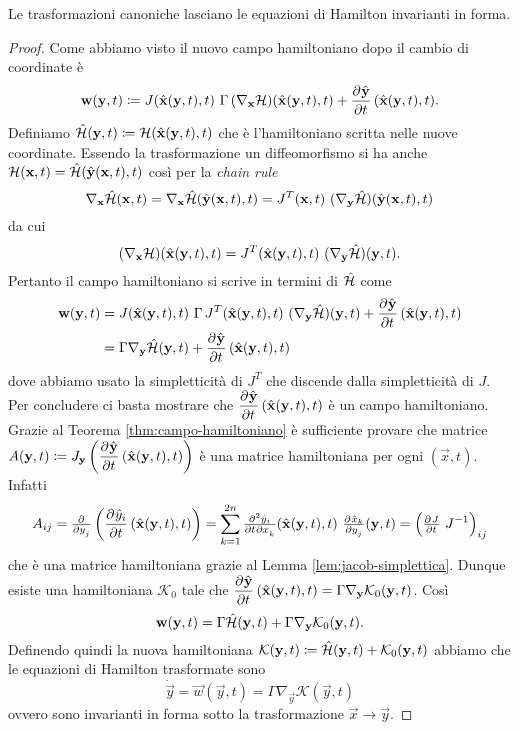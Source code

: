 \begin{thm}
    Le trasformazioni canoniche lasciano le equazioni di Hamilton invarianti in forma.
\end{thm}
\begin{proof}
    Come abbiamo visto il nuovo campo hamiltoniano dopo il cambio di coordinate è
    \[
        \vec{w}(\vec{y}, t) \coloneqq J(\hat{\vec{x}}(\vec{y}, t), t) \ \Gamma \, (\nabla_\vec{x} \ham)(\hat{\vec{x}}(\vec{y}, t), t) + \dpd{\hat{\vec{y}}}{t}(\hat{\vec{x}}(\vec{y}, t), t).
    \]
    Definiamo $ \hat{\mathcal{H}}(\mathbf{y}, t) \coloneqq \mathcal{H}(\hat{\mathbf{x}}(\mathbf{y}, t), t) $ che è l'hamiltoniano scritta nelle nuove coordinate. Essendo la trasformazione un diffeomorfismo si ha anche $ \mathcal{H}(\mathbf{x}, t) = \hat{\mathcal{H}}(\hat{\mathbf{y}}(\mathbf{x}, t), t) $ così per la \emph{chain rule}
    \[
        \nabla_\vec{x} \hat{\ham}(\vec{x}, t) = \nabla_\vec{x} \hat{\ham}(\hat{\vec{y}}(\vec{x}, t), t) = J^{T}(\vec{x}, t )\ (\nabla_\vec{y} \hat{\ham})(\hat{\vec{y}}(\vec{x}, t), t)
    \]
    da cui
    \[
        (\nabla_{\mathbf{x}} \mathcal{H})(\hat{\mathbf{x}}(\mathbf{y}, t), t) = J^{T}(\hat{\mathbf{x}}(\mathbf{y}, t), t) \ (\nabla_{\mathbf{y}} \hat{\mathcal{H}})(\mathbf{y}, t).
    \]
    Pertanto il campo hamiltoniano si scrive in termini di $ \hat{\mathcal{H}} $ come
    \begin{align*}
        \vec{w}(\vec{y}, t) & = J(\hat{\vec{x}}(\vec{y}, t), t) \ \Gamma \, J^{T}(\hat{\vec{x}}(\vec{y}, t), t) \ (\nabla_\vec{y} \hat{\ham})(\vec{y}, t) + \dpd{\hat{\vec{y}}}{t}(\hat{\vec{x}}(\vec{y}, t), t) \\
        & = \Gamma \nabla_\vec{y} \hat{\ham}(\vec{y}, t) +  \dpd{\hat{\vec{y}}}{t}(\hat{\vec{x}}(\vec{y}, t), t)
    \end{align*}
    dove abbiamo usato la simpletticità di $ J^T $ che discende dalla simpletticità di $ J $. \\
    Per concludere ci basta mostrare che $ \dpd{\hat{\vec{y}}}{t}(\hat{\vec{x}}(\vec{y}, t), t) $ è un campo hamiltoniano. Grazie al Teorema \ref{thm:campo-hamiltoniano} è sufficiente provare che matrice $ A(\vec{y}, t) \coloneqq J_\vec{y} \left(\dpd{\hat{\vec{y}}}{t}(\hat{\vec{x}}(\vec{y}, t), t)\right) $ è una matrice hamiltoniana per ogni $ (\vec{x}, t) $. Infatti
    \[
        A_{ij} = \pd{}{y_j} \left(\dpd{\hat{y}_i}{t}(\hat{\vec{x}}(\vec{y}, t), t)\right) = \sum_{k=1}^{2n} \md{\hat{y}_i}{2}{t}{}{x_k}{} (\hat{\vec{x}}(\vec{y}, t), t) \ \pd{\hat{x}_k}{y_j} (\vec{y}, t) = \left(\pd{J}{t} \ J^{-1}\right)_{ij}
    \]
    che è una matrice hamiltoniana grazie al Lemma \ref{lem:jacob-simplettica}. Dunque esiste una hamiltoniana $ \mathcal{K}_0 $ tale che $ \dpd{\hat{\vec{y}}}{t}(\hat{\vec{x}}(\vec{y}, t), t) = \Gamma \nabla_\vec{y} \mathcal{K}_0(\vec{y}, t) $. Così
    \[
        \mathbf{w}(\mathbf{y}, t) = \Gamma \hat{\mathcal{H}}(\mathbf{y}, t) + \Gamma \nabla_{\mathbf{y}} \mathcal{K}_0(\mathbf{y}, t).
    \]
    Definendo quindi la nuova hamiltoniana $ \mathcal{K}(\mathbf{y}, t) \coloneqq \hat{\mathcal{H}}(\mathbf{y}, t) + \mathcal{K}_0(\mathbf{y}, t) $ abbiamo che le equazioni di Hamilton trasformate sono
    \[
        \dot{\vec{y}} = \vec{w}(\vec{y}, t) = \Gamma \nabla_\vec{y} \mathcal{K}(\vec{y}, t)
    \]
    ovvero sono invarianti in forma sotto la trasformazione $ \vec{x} \to \vec{y} $.
\end{proof}


